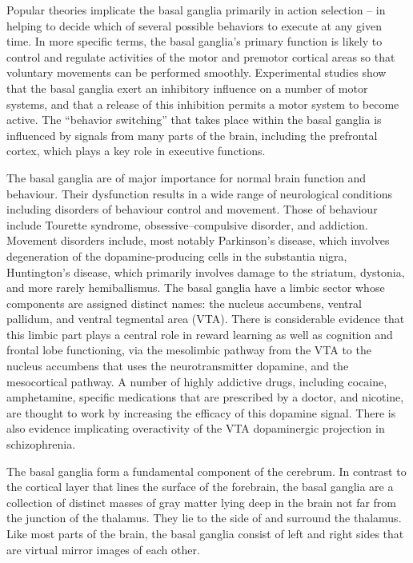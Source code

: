 \documentclass[]{book}
\begin{document}
Popular theories implicate the basal ganglia primarily in action selection -- in helping to decide which of several possible behaviors to execute at any given time. In more specific terms, the basal ganglia's primary function is likely to control and regulate activities of the motor and premotor cortical areas so that voluntary movements can be performed smoothly. Experimental studies show that the basal ganglia exert an inhibitory influence on a number of motor systems, and that a release of this inhibition permits a motor system to become active. The ``behavior switching'' that takes place within the basal ganglia is influenced by signals from many parts of the brain, including the prefrontal cortex, which plays a key role in executive functions.

The basal ganglia are of major importance for normal brain function and behaviour. Their dysfunction results in a wide range of neurological conditions including disorders of behaviour control and movement. Those of behaviour include Tourette syndrome, obsessive--compulsive disorder, and addiction. Movement disorders include, most notably Parkinson's disease, which involves degeneration of the dopamine-producing cells in the substantia nigra, Huntington's disease, which primarily involves damage to the striatum, dystonia, and more rarely hemiballismus. The basal ganglia have a limbic sector whose components are assigned distinct names: the nucleus accumbens, ventral pallidum, and ventral tegmental area (VTA). There is considerable evidence that this limbic part plays a central role in reward learning as well as cognition and frontal lobe functioning, via the mesolimbic pathway from the VTA to the nucleus accumbens that uses the neurotransmitter dopamine, and the mesocortical pathway. A number of highly addictive drugs, including cocaine, amphetamine, specific medications that are prescribed by a doctor, and nicotine, are thought to work by increasing the efficacy of this dopamine signal. There is also evidence implicating overactivity of the VTA dopaminergic projection in schizophrenia.

The basal ganglia form a fundamental component of the cerebrum. In contrast to the cortical layer that lines the surface of the forebrain, the basal ganglia are a collection of distinct masses of gray matter lying deep in the brain not far from the junction of the thalamus. They lie to the side of and surround the thalamus. Like most parts of the brain, the basal ganglia consist of left and right sides that are virtual mirror images of each other.
\end{document}

